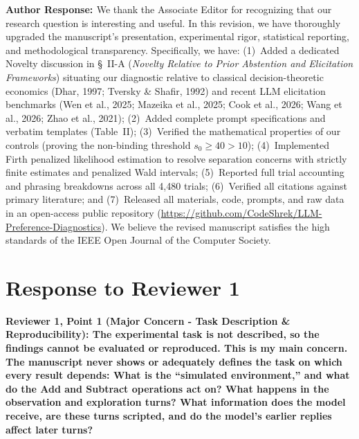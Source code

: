 \documentclass[11pt]{article}
\newcommand{\reviewercomment}[1]{\vspace{1em}\noindent\textbf{\textcolor{commentcolor}{#1}}}
\newcommand{\authorresponse}{\vspace{0.5em}\noindent\textbf{\textcolor{responsecolor}{Author Response: }}}
\begin{document}
\authorresponse We thank the Associate Editor for recognizing that our research question is interesting and useful. In this revision, we have thoroughly upgraded the manuscript's presentation, experimental rigor, statistical reporting, and methodological transparency. Specifically, we have: (1)~Added a dedicated Novelty discussion in \S~II-A (\textit{Novelty Relative to Prior Abstention and Elicitation Frameworks}) situating our diagnostic relative to classical decision-theoretic economics (Dhar, 1997; Tversky \& Shafir, 1992) and recent LLM elicitation benchmarks (Wen et al., 2025; Mazeika et al., 2025; Cook et al., 2026; Wang et al., 2026; Zhao et al., 2021); (2)~Added complete prompt specifications and verbatim templates (Table~II); (3)~Verified the mathematical properties of our controls (proving the non-binding threshold $s_0 \ge 40 > 10$); (4)~Implemented Firth penalized likelihood estimation to resolve separation concerns with strictly finite estimates and penalized Wald intervals; (5)~Reported full trial accounting and phrasing breakdowns across all 4,480 trials; (6)~Verified all citations against primary literature; and (7)~Released all materials, code, prompts, and raw data in an open-access public repository (\url{https://github.com/CodeShrek/LLM-Preference-Diagnostics}). We believe the revised manuscript satisfies the high standards of the IEEE Open Journal of the Computer Society.

\section*{Response to Reviewer 1}

\reviewercomment{Reviewer 1, Point 1 (Major Concern - Task Description \& Reproducibility): The experimental task is not described, so the findings cannot be evaluated or reproduced. This is my main concern. The manuscript never shows or adequately defines the task on which every result depends: What is the ``simulated environment,'' and what do the Add and Subtract operations act on? What happens in the observation and exploration turns? What information does the model receive, are these turns scripted, and do the model's earlier replies affect later turns?}
\end{document}
